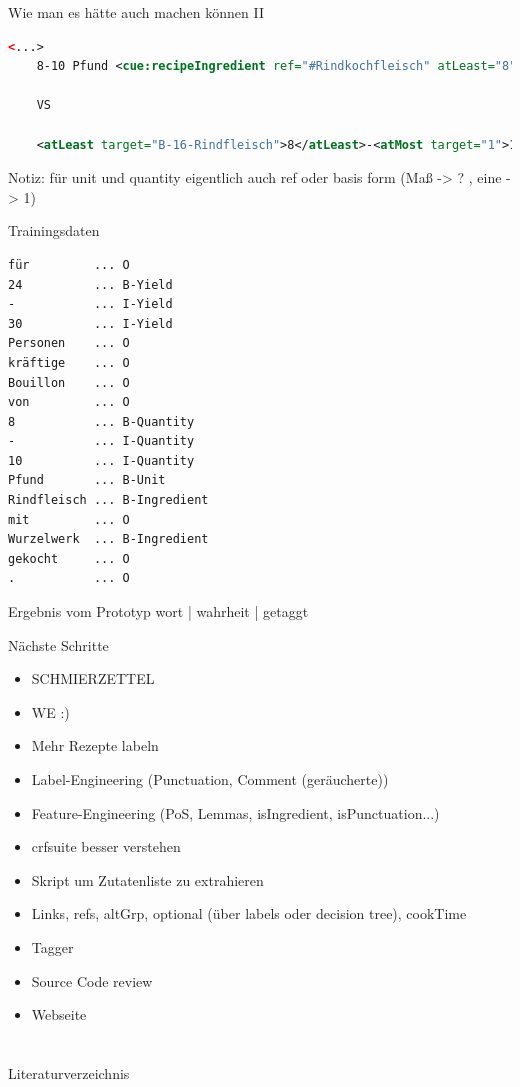 \documentclass[12pt]{beamer}
\begin{document}
\begin{frame}[fragile]{Wie man es hätte auch machen können II}
	\begin{lstlisting}[language=XML]
	<...>
	8-10 Pfund <cue:recipeIngredient ref="#Rindkochfleisch" atLeast="8" atMost="10" unit="Pfund">Rindfleisch</cue:recipeIngredient>
	
	VS
	
	<atLeast target="B-16-Rindfleisch">8</atLeast>-<atMost target="1">10</atMost> <unit target="B-16-Rindfleisch">Pfund</unit> <recipeIngredient xml:id="B-16-Rindfleisch" ref="#Suppenrindfleisch">Rindfleisch</recipeIngredient>
	\end{lstlisting}
	Notiz: für unit und quantity eigentlich auch ref oder basis form (Maß -> ? , eine -> 1)
\end{frame}

\begin{frame}[fragile]{Trainingsdaten}
	\vspace{-0.7em}\begin{lstlisting}
für			...	O
24			... B-Yield
-			... I-Yield
30			... I-Yield
Personen	...	O
kräftige	... O
Bouillon	... O
von			...	O
8			...	B-Quantity
-			...	I-Quantity
10			...	I-Quantity
Pfund		...	B-Unit
Rindfleisch	... B-Ingredient
mit			...	O
Wurzelwerk	...	B-Ingredient
gekocht		...	O
.			...	O
	\end{lstlisting}
\end{frame}	

\begin{frame}{Ergebnis vom Prototyp}
	wort | wahrheit | getaggt
\end{frame}


\begin{frame}{Nächste Schritte}
	\begin{itemize}
		\item SCHMIERZETTEL
		\item WE :)
		\item Mehr Rezepte labeln
		\item Label-Engineering (Punctuation, Comment (geräucherte))
		\item Feature-Engineering (PoS, Lemmas, isIngredient, isPunctuation...)
		\item crfsuite besser verstehen
		\item Skript um Zutatenliste zu extrahieren
		\item Links, refs, altGrp, optional (über labels oder decision tree), cookTime
		\item Tagger
		\item Source Code review
		\vspace{1em}
		\item Webseite
	\end{itemize}
\end{frame}
	
\section{}
\begin{frame}[t,allowframebreaks]{Literaturverzeichnis}
	\printbibliography[heading=none]
\end{frame}
\end{document}
